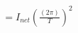 \documentclass[preview]{standalone}
\begin{document}
\begin{align*}
= I_{net} (\frac{(2\pi)}{T})^2
\end{align*}
\end{document}
